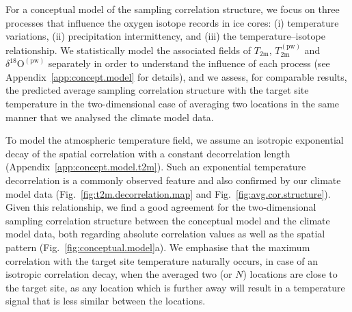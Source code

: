 \documentclass[cp, manuscript]{copernicus}
\begin{document}
For a conceptual model of the sampling correlation structure, we focus on three
processes that influence the oxygen isotope records in ice cores: (i)
temperature variations, (ii) precipitation intermittency, and (iii) the
temperature--isotope relationship. We statistically model the associated fields
of $T_{\mathrm{2m}}$, $T_{2\mathrm{m}}^{\mathrm{(pw)}}$ and
$\delta^{18}\mathrm{O}^{\mathrm{(pw)}}$ separately in order to understand the
influence of each process (see Appendix~\ref{app:concept.model} for details),
and we assess, for comparable results, the predicted average sampling
correlation structure with the target site temperature in the two-dimensional
case of averaging two locations in the same manner that we analysed the climate
model data.

To model the atmospheric temperature field, we assume an isotropic exponential
decay of the spatial correlation with a constant decorrelation length
(Appendix~\ref{app:concept.model.t2m}). Such an exponential temperature
decorrelation is a commonly observed feature \citep{Jones1997} and also
confirmed by our climate model data (Fig.~\ref{fig:t2m.decorrelation.map} and
Fig.~\ref{fig:avg.cor.structure}). Given this relationship, we find a good
agreement for the two-dimensional sampling correlation structure between the
conceptual model and the climate model data, both regarding absolute correlation
values as well as the spatial pattern (Fig.~\ref{fig:conceptual.model}a). We
emphasise that the maximum correlation with the target site temperature
naturally occurs, in case of an isotropic correlation decay, when the averaged
two (or $N$) locations are close to the target site, as any location which is
further away will result in a temperature signal that is less similar between
the locations.
\end{document}
